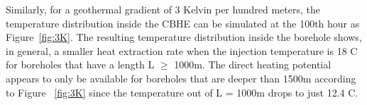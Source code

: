 		Similarly, for a geothermal gradient of 3 Kelvin per hundred meters, the temperature distribution inside the CBHE can be simulated at the 100th hour as Figure~\ref{fig:3K}. The resulting temperature distribution inside the borehole shows, in general, a smaller heat extraction rate when the injection temperature is 18 \degree C for boreholes that have a length L $\geq$ 1000m. The direct heating potential appears to only be available for boreholes that are deeper than 1500m according to Figure ~\ref{fig:3K} since the temperature out of L = 1000m drops to just 12.4 \degree C.
	        
	    
	        
